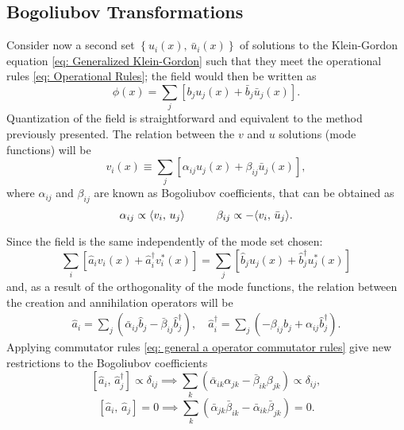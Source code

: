 \subsection{Bogoliubov Transformations}
Consider now a second set $\left\{u_i(x),\,\bar u_i(x)\right\}$ of solutions to the Klein-Gordon equation \ref{eq: Generalized Klein-Gordon} such that they meet the operational rules \ref{eq: Operational Rules}; the field would then be written as
\begin{equation}
	\phi(x)=\sum_j\left[b_ju_j(x)+\bar b_j\bar u_j(x)\right].
\end{equation}
Quantization of the field is straightforward and equivalent to the method previously presented. The relation between the $v$ and $u$ solutions (mode functions) will be
\begin{equation}
	v_i(x)\equiv\sum_j\left[\alpha_{ij}u_j(x)+\beta_{ij}\bar u_j(x)\right],
\end{equation}
where $\alpha_{ij}$ and $\beta_{ij}$ are known as Bogoliubov coefficients, that can be obtained as
\begin{equation}
	\alpha_{ij}\propto\langle v_i,\,u_j\rangle\hspace{1.0cm}\beta_{ij}\propto -\langle v_i,\,\bar u_j\rangle.
\end{equation}

Since the field is the same independently of the mode set chosen:
\begin{equation}
	\sum_i\left[\hat{a}_iv_i(x)+\hat{a}_i^\dagger v^*_i(x)\right]=\sum_j\left[\hat{b}_ju_j(x)+\hat{b}_j^\dagger u_j^*(x)\right]
\end{equation}
and, as a result of the orthogonality of the mode functions, the relation between the creation and annihilation operators will be 
\begin{subequations}
	\begin{gather}
		\hat{a}_i=\sum_j\left(\bar \alpha_{ij}\hat{b}_j-\bar \beta_{ij}\hat{b}_j^\dagger\right),\quad \hat{a}_i^\dagger=\sum_j\left(-\beta_{ij}\hat{b}_j+\alpha_{ij}\hat{b}_j^\dagger\right).\tag{\theequation \,\,a,b}
	\end{gather}
\end{subequations}
Applying commutator rules \ref{eq: general a operator commutator rules} give new restrictions to the Bogoliubov coefficients
\begin{equation}
	\left[\hat{a}_i,\,\hat{a}_j^\dagger\right]\propto\delta_{ij}\implies \sum_k\left(\bar \alpha_{ik}\alpha_{jk}-\bar \beta_{ik}\beta_{jk}\right)\propto\delta_{ij},
\end{equation}
\begin{equation}
	\left[\hat{a}_i,\,\hat{a}_j\right]=0\implies \sum_k\left(\bar \alpha_{jk}\bar \beta_{ik}-\bar \alpha_{ik}\bar \beta_{jk}\right)=0.
\end{equation}

